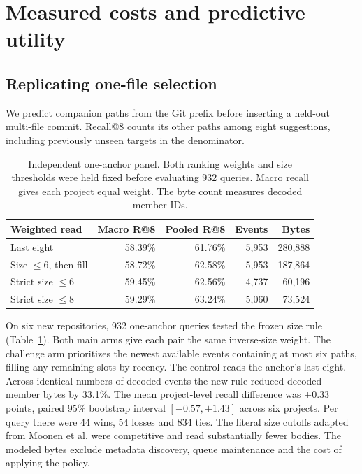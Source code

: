 \documentclass[conference]{IEEEtran}
\begin{document}
\section{Measured costs and predictive utility}
\subsection{Replicating one-file selection}
We predict companion paths from the Git prefix before inserting a held-out multi-file commit. Recall@8 counts its other paths among eight suggestions, including previously unseen targets in the denominator.

\begin{table}[t]
\caption{Independent one-anchor panel. Both ranking weights and size thresholds were held fixed before evaluating 932 queries. Macro recall gives each project equal weight. The byte count measures decoded member IDs.}
\label{tab:replication}\centering\small
\setlength{\tabcolsep}{3.5pt}
\begin{tabular}{@{}lrrrr@{}}\toprule
Weighted read & Macro R@8 & Pooled R@8 & Events & Bytes \\\midrule
Last eight & 58.39\% & 61.76\% & 5,953 & 280,888\\
Size $\le6$, then fill & 58.72\% & 62.58\% & 5,953 & 187,864\\
Strict size $\le6$ & 59.45\% & 62.56\% & 4,737 & 60,196\\
Strict size $\le8$ & 59.29\% & 63.24\% & 5,060 & 73,524\\\bottomrule
\end{tabular}
\end{table}

On six new repositories, 932 one-anchor queries tested the frozen size rule (Table~\ref{tab:replication}). Both main arms give each pair the same inverse-size weight. The challenge arm prioritizes the newest available events containing at most six paths, filling any remaining slots by recency. The control reads the anchor's last eight. Across identical numbers of decoded events the new rule reduced decoded member bytes by 33.1\%. The mean project-level recall difference was $+0.33$ points, paired 95\% bootstrap interval $[-0.57,+1.43]$ across six projects. Per query there were 44 wins, 54 losses and 834 ties. The literal size cutoffs adapted from Moonen et al. were competitive and read substantially fewer bodies. The modeled bytes exclude metadata discovery, queue maintenance and the cost of applying the policy.
\end{document}

